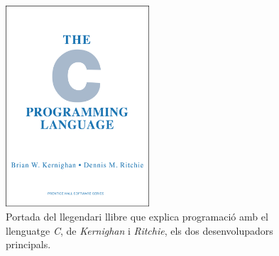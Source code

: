 \begin{figure}[ht!]
\centering
\includegraphics[height=75mm]{data/clang.png}
\caption{Portada del llegendari llibre que explica programació amb el llenguatge \emph{C}, de \emph{Kernighan} i \emph{Ritchie}, els dos desenvolupadors principals.}
\label{websshare}
\end{figure}

